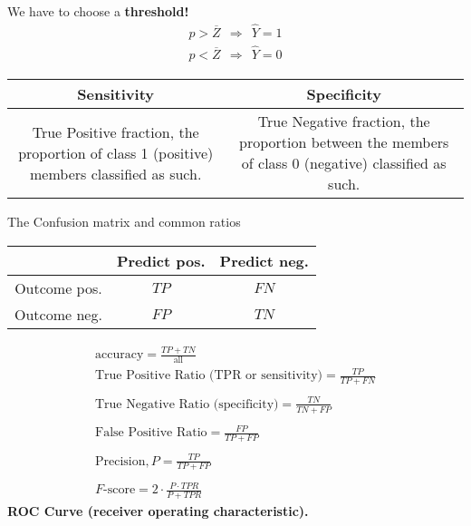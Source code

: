 We have to choose a \textbf{threshold!}
\begin{gather*}
    p >\overline{Z} \ \ \Longrightarrow \ \ \hat{Y} =1\\
    p< \overline{Z} \ \ \Longrightarrow \ \ \hat{Y} =0
\end{gather*}
\begin{center}
    
    \begin{tabular}{cc}
        \toprule 
        \textbf{Sensitivity}                                                                     & \textbf{Specificity}                                                                                 \\
        \midrule 
        True Positive fraction, the proportion of class 1 (positive) members classified as such. & True Negative fraction, the proportion between the members of class 0 (negative) classified as such. \\
        \bottomrule
    \end{tabular}
\end{center}

The Confusion matrix and common ratios

\begin{center}
    
    \begin{tabular}{|c|c|c|}
        \hline 
                     & Predict pos. & Predict neg. \\
        \hline 
        Outcome pos. & $TP$         & $FN$         \\
        \hline 
        Outcome neg. & $FP$         & $TN$         \\
        \hline
    \end{tabular}
\end{center}

\begin{gather*}
    \text{accuracy} =\frac{TP+TN}{\text{all}}\\
    \text{True Positive Ratio (TPR or sensitivity)} =\frac{TP}{TP+FN}\\
    \\
    \text{True Negative Ratio (specificity)} =\frac{TN}{TN+FP}\\
    \\
    \text{False Positive Ratio} =\frac{FP}{TP+FP}\\
    \\
    \text{Precision} ,P=\frac{TP}{TP+FP}\\
    \\
    F\text{-score} =2\cdot \frac{P\cdot TPR}{P+TPR}
\end{gather*}
\textbf{ROC Curve (receiver operating characteristic).}

